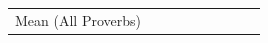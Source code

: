 \begin{table}
\begin{tabular}{lrrrrrrrr}
{        Mean (All Proverbs)                                                                                                                                                                                                                                                                                                                                                                                                                                                                                                                                                                                                                                                                                                                                                                                                                                                                                                                                                                                                                                                                                                                                                                                                                                                                                                                                                                                                                                                                                                                                                                                                                                                                                                                                                                                                                                                                                                                                                                                                                                                                                                                                                                                                                                                                                                                                                                                                                                                                                                                                                                                                                                                                                                                                                                                                                                                                                                                                                                                                                                                                                                                                                                                                                                                                                                                                                                                                   }
\end{tabular}
\end{table}
